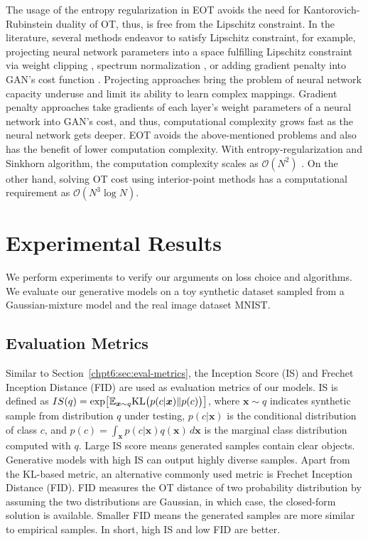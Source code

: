 \begin{remark}

The usage of the entropy regularization in EOT avoids the need for Kantorovich-Rubinstein duality
of OT, thus, is free from the Lipschitz constraint. In the literature, several methods endeavor to
satisfy Lipschitz constraint, for example, projecting neural network
parameters into a space fulfilling Lipschitz constraint via weight
clipping \cite{2017arXiv170107875A}, spectrum
normalization \cite{2018arXiv180205957M}, or adding gradient 
penalty into GAN's cost function \cite{2017arXiv170400028G}. Projecting
approaches bring the problem of neural network capacity underuse and
limit its ability to learn complex mappings. Gradient penalty approaches take
gradients of each layer's weight parameters of a neural network into
GAN's cost, and thus, computational complexity grows fast as the neural
network gets deeper. 
EOT avoids the above-mentioned problems and also has the benefit of lower
computation complexity. With entropy-regularization and Sinkhorn
algorithm, the computation complexity scales as $\mathcal{O}(N^2)$ \cite{2013arXiv1306.0895C}. 
On the other hand, solving OT cost using interior-point methods has a computational requirement as 
$\mathcal{O}(N^3\log{N})$. 

\end{remark}

\section{Experimental Results}
We perform experiments to verify our arguments on loss choice and algorithms. We evaluate our
generative models on a toy synthetic dataset sampled from a Gaussian-mixture model and the real image dataset MNIST.

\subsection{Evaluation Metrics}\label{subsec-metric}
Similar to Section~\ref{chpt6:sec:eval-metrics}, the Inception Score (IS) \cite{NIPS2016_6125} and Frechet Inception Distance (FID)\cite{2017arXiv170608500H} are used as evaluation metrics of our models. IS is defined as $
  IS(q) = \exp\bigl[ \mathbb{E}_{\bm{x} \sim q} \mathrm{KL}\bigl( p(c | \bm{x})\| p(c) \bigr)  \bigr]$,
where $\bm{x}\sim q$ indicates synthetic sample from distribution $q$ under testing, $p(c|\bm{x})$ is the conditional distribution of class $c$, and $p(c) = \int_{\bm{x}}p(c|\bm{x})q(\bm{x}) \,d \bm{x} $ is the marginal class distribution computed with $q$. Large IS score means generated samples contain clear objects. Generative models with high IS can output highly diverse samples. Apart from the KL-based metric, an alternative commonly used metric is Frechet Inception Distance (FID)\cite{2017arXiv170608500H}. FID measures the OT distance of two probability distribution by assuming the two distributions are Gaussian, in which case, the closed-form solution is available. Smaller FID means the generated samples are more similar to empirical samples. In short, high IS and low FID are better.


